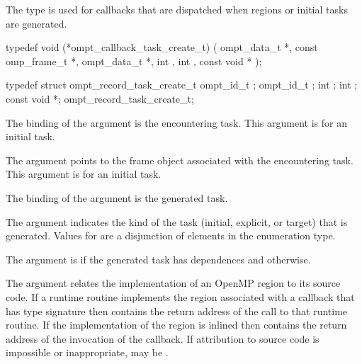 \label{sec:ompt_callback_task_create_t}

\summary
The  type is used for callbacks that are 
dispatched when  regions or initial tasks are generated.

\format
\begin{ccppspecific}
\begin{omptCallback}
typedef void (*ompt_callback_task_create_t) (
  ompt_data_t *,
  const omp_frame_t *,
  ompt_data_t *,
  int ,
  int ,
  const void *
);
\end{omptCallback}
\end{ccppspecific}

\record
\begin{ccppspecific}
\begin{omptRecord}
typedef struct ompt_record_task_create_t {
  ompt_id_t ;
  ompt_id_t ;
  int ;
  int ;
  const void *;
} ompt_record_task_create_t;
\end{omptRecord}
\end{ccppspecific}

\argdesc
The binding of the  argument is the encountering task.
This argument is  for an initial task.

The  argument points to the frame object
associated with the encountering task. This argument is  
for an initial task.

The binding of the  argument is the generated task.

The  argument indicates the kind of the task (initial, explicit, 
or target) that is generated. Values for  are a disjunction of 
elements in the  enumeration type.

The  argument is  if the generated task 
has dependences and  otherwise.

The  argument relates the implementation of an OpenMP region
to its source code. If a runtime routine implements the region associated with
a callback that has type signature  then
 contains the return address of the call to that runtime routine.
If the implementation of the region is inlined then  contains the
return address of the invocation of the callback. If attribution to source code
is impossible or inappropriate, may be .

